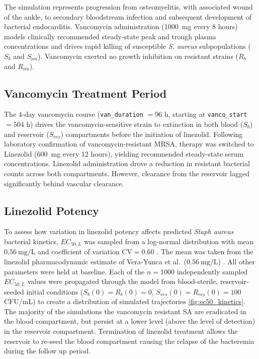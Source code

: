 \documentclass[12pt, draftcls, onecolumn]{IEEEtran}
\begin{document}
The simulation represents progression from osteomyelitis, with associated wound of the ankle, to secondary bloodstream infection and subsequent development of bacterial endocarditis. Vancomycin administration (1000~mg every 8 hours) models clinically recommended steady-state peak and trough plasma concentrations and drives rapid killing of susceptible \textit{S. aureus} subpopulations ($S_b$ and $S_{\text{res}}$). Vancomycin exerted no growth inhibition on resistant strains ($R_b$ and $R_{\text{res}}$).

\subsection{Vancomycin Treatment Period}

The 4-day vancomycin course (\texttt{van\_duration} $= 96$ h, starting at \texttt{vanco\_start} $=
504$ h) drives the vancomycin-sensitive strain to extinction in
both blood ($S_b$) and reservoir ($S_{res}$) compartments before
the initiation of linezolid.
Following laboratory confirmation of vancomycin-resistant MRSA, therapy was switched to Linezolid (600~mg every 12 hours),
yielding recommended steady-state serum concentrations. Linezolid administration drove a reduction in resistant bacterial
counts across both compartments. However, clearance
from the reservoir lagged significantly behind vascular clearance.


\subsection{Linezolid Potency}
To assess how variation in linezolid potency affects predicted
\textit{Staph aureus} bacterial kinetics, $EC_{50,L}$ was sampled from
a log-normal distribution with mean $0.56~\mathrm{mg/L}$ and coefficient
of variation $\mathrm{CV} = 0.60$ \cite{limpert2001lognormal}. The mean was taken from the linezolid pharmacodynamic
estimate of Vera-Yunca et al.\ ($0.56~\mathrm{mg/L}$) \cite{VeraYunca2025}. All other parameters were held at baseline. Each of the $n = 1000$
independently sampled $EC_{50,L}$ values were propagated through the model from blood-sterile, reservoir-seeded initial conditions ($S_b(0){=}R_b(0){=}0$, $S_{res}(0){=}R_{res}(0){=}100$
CFU/mL) to create a distribution of simulated trajectories \cref{fig:ec50_kinetics}.
The majority of the simulations the vancomycin resistant SA are eradicated in the blood compartment, but persist at a lower level (above the level of detection) in the reservoir compartment.  Termination of linezolid treatment allows the reservoir to re-seed the blood compartment causing the relapse of the bacteremia during the follow up period.
\end{document}
